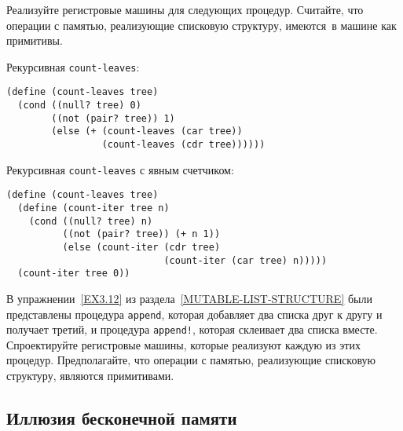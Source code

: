 \begin{exercise}{5.21}%
\label{EX5.21}%
Реализуйте регистровые машины для следующих процедур.
Считайте, что операции с памятью, реализующие списковую
структуру, имеются~в машине как примитивы.

\begin{plainenum}


\item
Рекурсивная {\tt count-leaves}:

\begin{Verbatim}[fontsize=\small]
(define (count-leaves tree)
  (cond ((null? tree) 0)
        ((not (pair? tree)) 1)
        (else (+ (count-leaves (car tree))
                 (count-leaves (cdr tree))))))
\end{Verbatim}

\item
Рекурсивная {\tt count-leaves} с явным
счетчиком:

\begin{Verbatim}[fontsize=\small]
(define (count-leaves tree)
  (define (count-iter tree n)
    (cond ((null? tree) n)
          ((not (pair? tree)) (+ n 1))
          (else (count-iter (cdr tree)
                            (count-iter (car tree) n)))))
  (count-iter tree 0))
\end{Verbatim}
\end{plainenum}
\end{exercise}
\begin{exercise}{5.22}%
\label{EX5.22}%
В упражнении~\ref{EX3.12} из 
раздела~\ref{MUTABLE-LIST-STRUCTURE} были представлены процедура
{\tt append}, которая добавляет два списка друг к другу и
получает третий, и процедура {\tt append!}, которая склеивает
два списка вместе. Спроектируйте регистровые машины, которые реализуют
каждую из этих процедур.  Предполагайте, что операции с памятью, реализующие списковую
структуру, являются примитивами.
\end{exercise}

\subsection{Иллюзия бесконечной памяти}
\label{MAINTAINING-THE-ILLUSION-OF-INFINITE-MEMORY}


